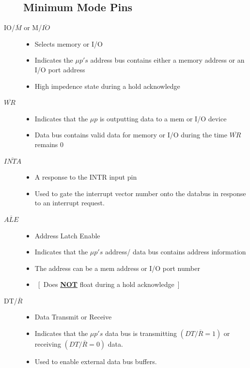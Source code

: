 \documentclass{article}
\begin{document}
\begin{description}
\subsection{Minimum Mode Pins}

  \item[IO/$\overline{M}$ or M/$\overline{IO}$]
  \begin{itemize}
      \item Selects memory or I/O
      \item Indicates the $\mu p's$ address bus contains either a memory address or an I/O
      port address
      \item High impedence state during a hold acknowledge
  \end{itemize}

  \item[$\overline{WR}$]
  \begin{itemize}
      \item Indicates that the $\mu p$ is outputting data to a mem or I/O device
      \item Data bus contains valid data for memory or I/O during the time $\overline{WR}$ remains 0
  \end{itemize}

  \item[$\overline{INTA}$]
  \begin{itemize}
      \item  A response to the INTR input pin
      \item  Used to gate the interrupt vector number onto the databus in response to an interrupt request.
  \end{itemize}

  \item[$\overline{ALE}$]
  \begin{itemize}
      \item  Address Latch Enable
      \item Indicates that the $\mu p's$ address/ data bus contains address information
      \item The address can be a mem address or I/O port number
      \item ~[~Does \textbf{\underline{NOT}} float during a hold acknowledge~]
  \end{itemize}

  \item[DT/$\overline{R}$]
  \begin{itemize}
      \item  Data Transmit or Receive
      \item Indicates that the $\mu p's$ data bus is transmitting $( DT/\overline{R} = 1 )$ or
      receiving $( DT/\overline{R} = 0 )$ data.
      \item Used to enable external data bus buffers.
  \end{itemize}


\end{description}
\end{document}
